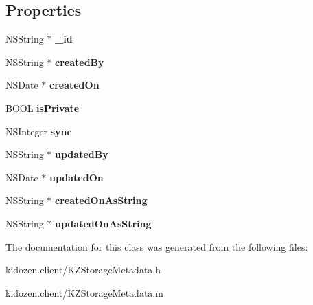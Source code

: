 \subsection*{Properties}
\begin{DoxyCompactItemize}
\item 
\hypertarget{interface_k_z_storage_metadata_a69e26dd21b962876245039d50116568f}{N\-S\-String $\ast$ {\bfseries \-\_\-id}}\label{interface_k_z_storage_metadata_a69e26dd21b962876245039d50116568f}

\item 
\hypertarget{interface_k_z_storage_metadata_adfac65d0103b6a9c4ae16e94f2582a42}{N\-S\-String $\ast$ {\bfseries created\-By}}\label{interface_k_z_storage_metadata_adfac65d0103b6a9c4ae16e94f2582a42}

\item 
\hypertarget{interface_k_z_storage_metadata_addda0a55c6d469618a5ee3af0e91a03a}{N\-S\-Date $\ast$ {\bfseries created\-On}}\label{interface_k_z_storage_metadata_addda0a55c6d469618a5ee3af0e91a03a}

\item 
\hypertarget{interface_k_z_storage_metadata_acf7ab98ce1ffd4fe457a7b301375027d}{B\-O\-O\-L {\bfseries is\-Private}}\label{interface_k_z_storage_metadata_acf7ab98ce1ffd4fe457a7b301375027d}

\item 
\hypertarget{interface_k_z_storage_metadata_ac94e8b6eb9809a9ae6150348032f5223}{N\-S\-Integer {\bfseries sync}}\label{interface_k_z_storage_metadata_ac94e8b6eb9809a9ae6150348032f5223}

\item 
\hypertarget{interface_k_z_storage_metadata_a0aa678e3cf3606f09d590007eca96ba3}{N\-S\-String $\ast$ {\bfseries updated\-By}}\label{interface_k_z_storage_metadata_a0aa678e3cf3606f09d590007eca96ba3}

\item 
\hypertarget{interface_k_z_storage_metadata_a5e2e0a2f10f4a080c58978fc0aae424f}{N\-S\-Date $\ast$ {\bfseries updated\-On}}\label{interface_k_z_storage_metadata_a5e2e0a2f10f4a080c58978fc0aae424f}

\item 
\hypertarget{interface_k_z_storage_metadata_a6f8dae8aab0fca98b1f61c70aa66f148}{N\-S\-String $\ast$ {\bfseries created\-On\-As\-String}}\label{interface_k_z_storage_metadata_a6f8dae8aab0fca98b1f61c70aa66f148}

\item 
\hypertarget{interface_k_z_storage_metadata_a2cd274409276f00531f433d346dea159}{N\-S\-String $\ast$ {\bfseries updated\-On\-As\-String}}\label{interface_k_z_storage_metadata_a2cd274409276f00531f433d346dea159}

\end{DoxyCompactItemize}


The documentation for this class was generated from the following files\-:\begin{DoxyCompactItemize}
\item 
kidozen.\-client/K\-Z\-Storage\-Metadata.\-h\item 
kidozen.\-client/K\-Z\-Storage\-Metadata.\-m\end{DoxyCompactItemize}
